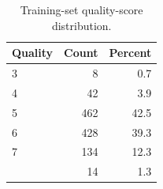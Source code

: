 \begin{table}

\caption{\label{tab:p2-quality-frequency}Training-set quality-score distribution.}
\centering
\begin{tabular}[t]{lrr}
\toprule
Quality & Count & Percent\\
\midrule
3 & 8 & 0.7\\
4 & 42 & 3.9\\
5 & 462 & 42.5\\
6 & 428 & 39.3\\
7 & 134 & 12.3\\
\addlinespace
8 & 14 & 1.3\\
\bottomrule
\end{tabular}
\end{table}
